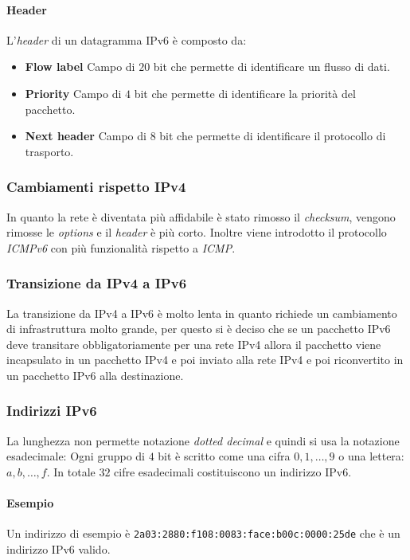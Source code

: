             \paragraph{Header} L'\textit{header} di un datagramma \Acrshort*{IPv6} è composto da: \begin{itemize}
                \item \textbf{Flow label} Campo di $20$ bit che permette di identificare un flusso di dati.
                \item \textbf{Priority} Campo di $4$ bit che permette di identificare la priorità del pacchetto.
                \item \textbf{Next header} Campo di $8$ bit che permette di identificare il protocollo di trasporto.
            \end{itemize}
        \subsubsection{Cambiamenti rispetto \Acrshort*{IPv4}}
            In quanto la rete è diventata più affidabile è stato rimosso il \textit{checksum}, vengono rimosse le \textit{options} e il \textit{header} è più corto. Inoltre viene introdotto il protocollo \textit{ICMPv6} con più funzionalità rispetto a \textit{ICMP}.
        \subsubsection{Transizione da \Acrshort*{IPv4} a \Acrshort*{IPv6}}
            La transizione da \Acrshort*{IPv4} a \Acrshort*{IPv6} è molto lenta in quanto richiede un cambiamento di infrastruttura molto grande, per questo si è deciso che se un pacchetto \Acrshort*{IPv6} deve transitare obbligatoriamente per una rete \Acrshort*{IPv4} allora il pacchetto viene incapsulato in un pacchetto \Acrshort*{IPv4} e poi inviato alla rete \Acrshort*{IPv4} e poi riconvertito in un pacchetto \Acrshort*{IPv6} alla destinazione.
        \subsubsection{Indirizzi \Acrshort*{IPv6}}
            La lunghezza non permette notazione \textit{dotted decimal} e quindi si usa la notazione esadecimale: Ogni gruppo di $4$ bit è scritto come una cifra $0,1,\dots,9$ o una lettera: $a,b,\dots,f$. In totale $32$ cifre esadecimali costituiscono un indirizzo \Acrshort*{IPv6}.
            \paragraph{Esempio} Un indirizzo di esempio è \texttt{2a03:2880:f108:0083:face:b00c:0000:25de} che è un indirizzo \Acrshort*{IPv6} valido.
